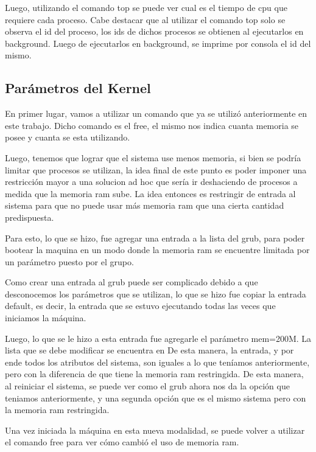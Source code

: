 \documentclass[a4paper, 12pt]{article}
\begin{document}
Luego, utilizando el comando top se puede ver cual es el tiempo de cpu que requiere cada proceso. Cabe destacar que al utilizar el comando top solo se observa el id del proceso, los ids de dichos procesos se obtienen al ejecutarlos en background. Luego de ejecutarlos en background, se imprime por consola el id del mismo.

\subsection*{Par\'ametros del Kernel}

En primer lugar, vamos a utilizar un comando que ya se utiliz\'o anteriormente en este trabajo. Dicho comando es el free, el mismo nos indica cuanta memoria se posee y cuanta se esta utilizando.

Luego, tenemos que lograr que el sistema use menos memoria, si bien se podr\'ia limitar que procesos se utilizan, la idea final de este punto es poder imponer una restricci\'on mayor a una solucion ad hoc que ser\'ia ir deshaciendo de procesos a medida que la memoria ram sube. La idea entonces es restringir de entrada al sistema para que no puede usar m\'as memoria ram que una cierta cantidad predispuesta.

Para esto, lo que se hizo, fue agregar una entrada a la lista del grub, para poder bootear la maquina en un modo donde la memoria ram se encuentre limitada por un par\'ametro puesto por el grupo.

Como crear una entrada al grub puede ser complicado debido a que desconocemos los par\'ametros que se utilizan, lo que se hizo fue copiar la entrada default, es decir, la entrada que se estuvo ejecutando todas las veces que iniciamos la m\'aquina. 

Luego, lo que se le hizo a esta entrada fue agregarle el par\'ametro mem=200M. La lista que se debe modificar se encuentra en  De esta manera, la entrada, y por ende todos los atributos del sistema, son iguales a lo que ten\'iamos anteriormente, pero con la diferencia de que tiene la memoria ram restringida. De esta manera, al reiniciar el sistema, se puede ver como el grub ahora nos da la opci\'on que teniamos anteriormente, y una segunda opci\'on que es el mismo sistema pero con la memoria ram restringida. 

Una vez iniciada la m\'aquina en esta nueva modalidad, se puede volver a utilizar el comando free para ver c\'omo cambi\'o el uso de memoria ram.
\end{document}
